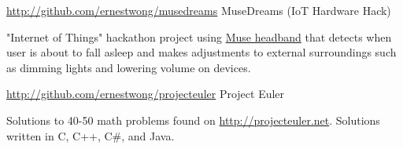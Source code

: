 \begin{cventries}
  \cventry
    {\href{http://github.com/ernestwong/musedreams}{http://github.com/ernestwong/musedreams}} %
    {MuseDreams (IoT Hardware Hack) } %
    {} %
    {} %
    {
      \begin{cvitems} %
      \item {"Internet of Things" hackathon project using \href{http://choosemuse.com} {Muse headband} that detects when user is about to fall asleep and makes adjustments to external surroundings such as dimming lights and lowering volume on devices. }
      \end{cvitems}
    }

  \cventry
    {\href{http://github.com/ernestwong/projecteuler}{http://github.com/ernestwong/projecteuler}} %
    {Project Euler} %
    {} %
    {} %
    {
      \begin{cvitems} %
        \item {Solutions to 40-50 math problems found on \href{http://projecteuler.net}{http://projecteuler.net}. Solutions written in C, C++, C\#, and Java.}
      \end{cvitems}
    }

\end{cventries}
